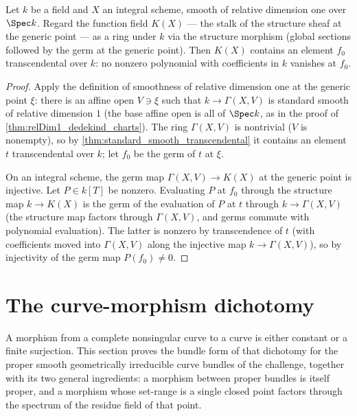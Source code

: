 \begin{theorem}
  \label{thm:relDim1_transcendental}
  \leanok
  Let \(k\) be a field and \(X\) an integral scheme, smooth of relative dimension one over
  \(\Spec k\). Regard the function field \(K(X)\) --- the stalk of the structure sheaf at
  the generic point --- as a ring under \(k\) via the structure morphism (global sections
  followed by the germ at the generic point). Then \(K(X)\) contains an element \(f_0\)
  transcendental over \(k\): no nonzero polynomial with coefficients in \(k\) vanishes at
  \(f_0\).
\end{theorem}
\begin{proof}
  \leanok
  Apply the definition of smoothness of relative dimension one at the generic point
  \(\xi\): there is an affine open \(V \ni \xi\) such that \(k \to \Gamma(X, V)\) is
  standard smooth of relative dimension \(1\) (the base affine open is all of \(\Spec k\),
  as in the proof of \ref{thm:relDim1_dedekind_charts}). The ring \(\Gamma(X, V)\) is
  nontrivial (\(V\) is nonempty), so by \ref{thm:standard_smooth_transcendental} it
  contains an element \(t\) transcendental over \(k\); let \(f_0\) be the germ of \(t\) at
  \(\xi\).

  On an integral scheme, the germ map \(\Gamma(X, V) \to K(X)\) at the generic point is
  injective. Let \(P \in k[T]\) be nonzero. Evaluating \(P\) at \(f_0\) through the
  structure map \(k \to K(X)\) is the germ of the evaluation of \(P\) at \(t\) through
  \(k \to \Gamma(X, V)\) (the structure map factors through \(\Gamma(X, V)\), and germs
  commute with polynomial evaluation). The latter is nonzero by transcendence of \(t\)
  (with coefficients moved into \(\Gamma(X, V)\) along the injective map \(k \to
  \Gamma(X, V)\)), so by injectivity of the germ map \(P(f_0) \neq 0\).
\end{proof}

\section{The curve-morphism dichotomy}
\label{sec:curve_morphism_dichotomy}

A morphism from a complete nonsingular curve to a curve is either constant or a finite
surjection. This section proves the bundle form of that dichotomy for the proper smooth
geometrically irreducible curve bundles of the challenge, together with its two general
ingredients: a morphism between proper bundles is itself proper, and a morphism whose
set-range is a single closed point factors through the spectrum of the residue field of
that point.


